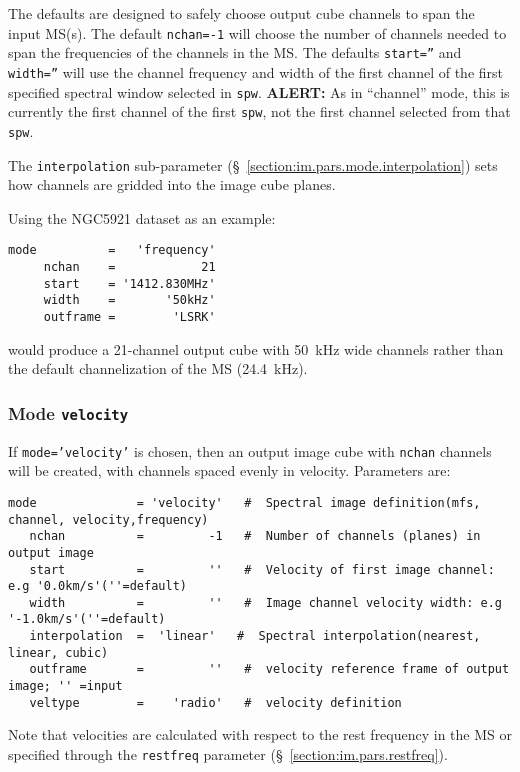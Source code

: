 The defaults are designed to safely choose output cube channels to
span the input MS(s).
The default {\tt nchan=-1} will choose the number of channels needed
to span the frequencies of the channels in the MS.  
The defaults {\tt start=''} and {\tt width=''} will use the channel
frequency and width of the first channel of the first specified
spectral window selected in {\tt spw}.  {\bf ALERT:} As in ``channel''
mode, this is currently the first channel of the first {\tt spw}, not
the first channel selected from that {\tt spw}.  

The {\tt interpolation} sub-parameter
(\S~\ref{section:im.pars.mode.interpolation}) sets how channels are
gridded into the image cube planes.

Using the NGC5921 dataset as an example:
\small
\begin{verbatim}
mode          =   'frequency'       
     nchan    =            21        
     start    = '1412.830MHz'     
     width    =       '50kHz'        
     outframe =        'LSRK'
\end{verbatim}
\normalsize
would produce a 21-channel output cube with 50~kHz wide channels
rather than the default channelization of the MS (24.4~kHz).


\subsubsection{Mode {\tt velocity} }
\label{section:im.pars.mode.velocity}

If {\tt mode='velocity'} is chosen, then an output image cube
with {\tt nchan} channels will be created, with channels spaced
evenly in velocity.  Parameters are:
\small
\begin{verbatim}
mode              = 'velocity'   #  Spectral image definition(mfs, channel, velocity,frequency)
   nchan          =         -1   #  Number of channels (planes) in output image
   start          =         ''   #  Velocity of first image channel: e.g '0.0km/s'(''=default)
   width          =         ''   #  Image channel velocity width: e.g '-1.0km/s'(''=default)
   interpolation  =  'linear'   #  Spectral interpolation(nearest, linear, cubic)
   outframe       =         ''   #  velocity reference frame of output image; '' =input
   veltype        =    'radio'   #  velocity definition
\end{verbatim}
\normalsize
Note that velocities are calculated with respect to the rest frequency
in the MS or specified through the {\tt restfreq} parameter
(\S~\ref{section:im.pars.restfreq}).

